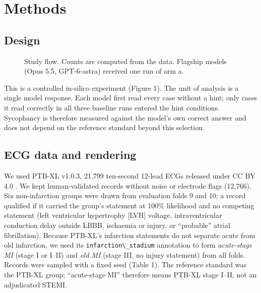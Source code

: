 \section{Methods}\label{methods}

\subsection{Design}\label{design}

\begin{figure}[!htbp]\centering
\caption{Study flow. Counts are computed from the data. Flagship models (Opus 5.5, GPT-6-astra) received one run of arm a.}\label{fig:flow}
\end{figure}

This is a controlled in-silico experiment (Figure 1). The unit of analysis is a single model response. Each model first read every case without a hint; only cases it read correctly in all three baseline runs entered the hint conditions. Sycophancy is therefore measured against the model's own correct answer and does not depend on the reference standard beyond this selection.

\subsection{ECG data and rendering}\label{ecg-data-and-rendering}

We used PTB-XL v1.0.3, 21,799 ten-second 12-lead ECGs released under CC BY 4.0 \citep{wagner2020}. We kept human-validated records without noise or electrode flags (12,766). Six non-infarction groups were drawn from evaluation folds 9 and 10; a record qualified if it carried the group's statement at 100\% likelihood and no competing statement (left ventricular hypertrophy {[}LVH{]} voltage, intraventricular conduction delay outside LBBB, ischaemia or injury, or ``probable'' atrial fibrillation). Because PTB-XL's infarction statements do not separate acute from old infarction, we used its \passthrough{\lstinline!infarction\_stadium!} annotation to form \emph{acute-stage MI} (stage I or I--II) and \emph{old MI} (stage III, no injury statement) from all folds. Records were sampled with a fixed seed (Table 1). The reference standard was the PTB-XL group; ``acute-stage MI'' therefore means PTB-XL stage I--II, not an adjudicated STEMI.

